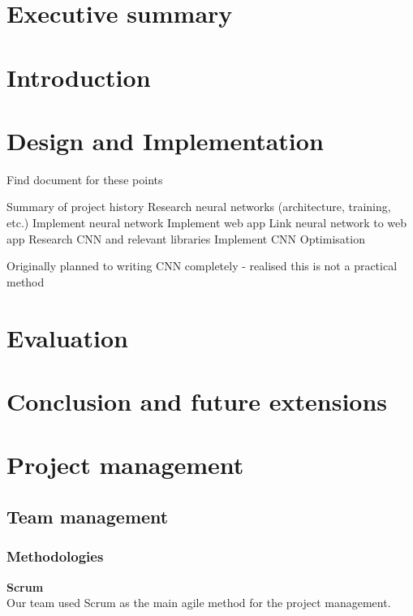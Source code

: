 \documentclass{article}
\begin{document}
\newpage

\tableofcontents

\newpage

\section{Executive summary}
 
\newpage

\section{Introduction}

\newpage

\section{Design and Implementation}  

Find document for these points

Summary of project history
	Research neural networks (architecture, training, etc.)
	Implement neural network
	Implement web app
	Link neural network to web app
	Research CNN and relevant libraries
	Implement CNN
	Optimisation

Originally planned to writing CNN completely - realised this is not a practical method

\newpage

\section{Evaluation}  
 
\newpage

\section{Conclusion and future extensions}  
 
\newpage

\section{Project management}  
\subsection{Team management}
\subsubsection{Methodologies}
\textbf{Scrum}\\
Our team used Scrum as the main agile method for the project management.\\
\end{document}
